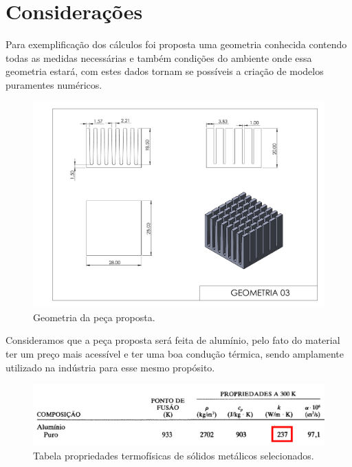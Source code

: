 \chapter{Considerações}\label{cap:definitions}

Para exemplificação dos cálculos foi proposta uma geometria conhecida contendo todas as medidas necessárias e também condições do ambiente onde essa geometria estará, com estes dados tornam se possíveis a criação de modelos puramentes numéricos.

\begin{figure}[h]
    \centering
    \caption{Geometria da peça proposta.}
    \label{fig:geometry}
    \includegraphics[width=15cm]{figuras/geometria.pdf}
\end{figure}

Consideramos que a peça proposta será feita de alumínio, pelo fato do material ter um preço mais acessível e ter uma boa condução térmica, sendo amplamente utilizado na indústria para esse mesmo propósito.

\begin{figure}[h]
    \centering
    \caption{Tabela propriedades termofísicas de sólidos metálicos selecionados.}
    \label{fig:metalProps}
    \includegraphics[width=14cm]{figuras/metalProps.jpg}
\end{figure}

